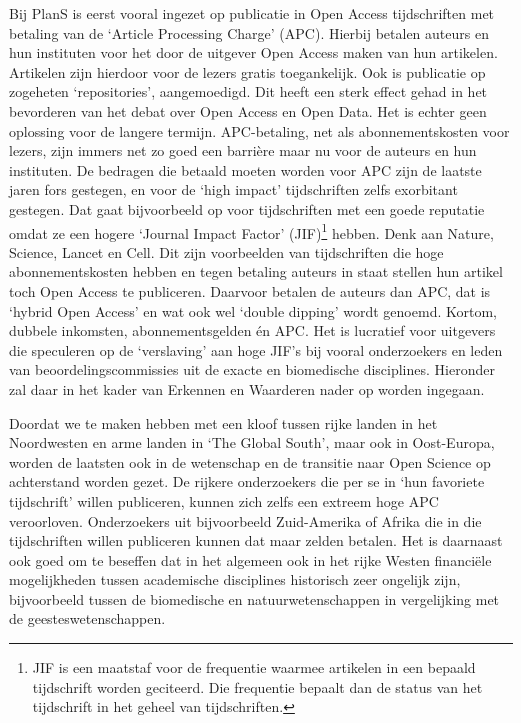 \documentclass[empirical, authordate, ]{new-jote-article}
\begin{document}
	Bij PlanS is eerst vooral ingezet op publicatie in Open Access tijdschriften met betaling van de ‘Article Processing Charge' (APC). Hierbij betalen auteurs en hun instituten voor het door de uitgever Open Access maken van hun artikelen. Artikelen zijn hierdoor voor de lezers gratis toegankelijk. Ook is publicatie op zogeheten ‘repositories', aangemoedigd. Dit heeft een sterk effect gehad in het bevorderen van het debat over Open Access en Open Data. Het is echter geen oplossing voor de langere termijn. APC-betaling, net als abonnementskosten voor lezers, zijn immers net zo goed een barrière maar nu voor de auteurs en hun instituten. De bedragen die betaald moeten worden voor APC zijn de laatste jaren fors gestegen, en voor de ‘high impact' tijdschriften zelfs exorbitant gestegen. Dat gaat bijvoorbeeld op voor tijdschriften met een goede reputatie omdat ze een hogere ‘Journal Impact Factor' (JIF)\footnote{JIF is een maatstaf voor de frequentie waarmee artikelen in een bepaald tijdschrift worden geciteerd. Die frequentie bepaalt dan de status van het tijdschrift in het geheel van tijdschriften.} hebben. Denk aan Nature, Science, Lancet en Cell. Dit zijn voorbeelden van tijdschriften die hoge abonnementskosten hebben en tegen betaling auteurs in staat stellen hun artikel toch Open Access te publiceren. Daarvoor betalen de auteurs dan APC, dat is ‘hybrid Open Access' en wat ook wel ‘double dipping' wordt genoemd. Kortom, dubbele inkomsten, abonnementsgelden én APC. Het is lucratief voor uitgevers die speculeren op de ‘verslaving' aan hoge JIF's bij vooral onderzoekers en leden van beoordelingscommissies uit de exacte en biomedische disciplines. Hieronder zal daar in het kader van Erkennen en Waarderen nader op worden ingegaan.



	Doordat we te maken hebben met een kloof tussen rijke landen in het Noordwesten en arme landen in ‘The Global South', maar ook in Oost-Europa, worden de laatsten ook in de wetenschap en de transitie naar Open Science op achterstand worden gezet. De rijkere onderzoekers die per se in ‘hun favoriete tijdschrift' willen publiceren, kunnen zich zelfs een extreem hoge APC veroorloven. Onderzoekers uit bijvoorbeeld Zuid-Amerika of Afrika die in die tijdschriften willen publiceren kunnen dat maar zelden betalen. Het is daarnaast ook goed om te beseffen dat in het algemeen ook in het rijke Westen financiële mogelijkheden tussen academische disciplines historisch zeer ongelijk zijn, bijvoorbeeld tussen de biomedische en natuurwetenschappen in vergelijking met de geesteswetenschappen.
\end{document}
